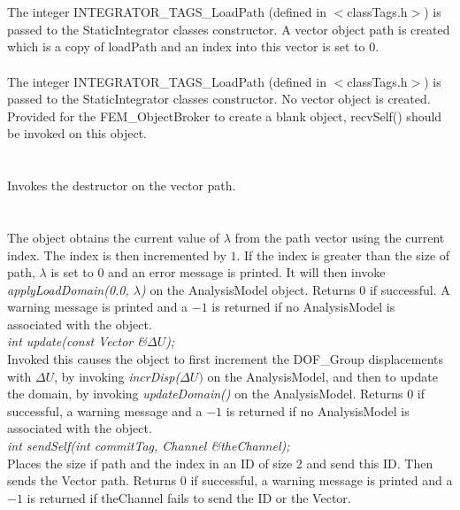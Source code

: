  \\
\\ 
The integer INTEGRATOR\_TAGS\_LoadPath (defined in
$<$classTags.h$>$) is passed to the StaticIntegrator classes
constructor. A vector object \p path is created which is a copy of
\p loadPath and an index into this vector is set to $0$.\\

\\ 
The integer INTEGRATOR\_TAGS\_LoadPath (defined in $<$classTags.h$>$) is
passed to the StaticIntegrator classes constructor. No vector object
is created. Provided for the FEM\_ObjectBroker to create a blank
object, recvSelf() should be invoked on this object. \\

 \\
\\ 
Invokes the destructor on the vector \p path. \\

\\
 \\
The object obtains the current value of $\lambda$ from the \p path
vector using the current index. The index is then incremented by
$1$. If the index is greater than the size of \p path, $\lambda$ is
set to $0$ and an error message is printed. It will then invoke
{\em applyLoadDomain(0.0, $\lambda$)} on the AnalysisModel
object. Returns $0$ if successful. A warning message is printed and a
$-1$ is returned if no AnalysisModel is associated with the object. \\

{\em int update(const Vector \&$\Delta U$);} \\
Invoked this causes the object to first increment the DOF\_Group
displacements with $\Delta U$, by invoking {\em incrDisp($\Delta U)$}
on the AnalysisModel, and then to update the domain, by invoking {\em
updateDomain()} on the AnalysisModel. Returns $0$ if successful, a
warning message and a $-1$ is returned if no AnalysisModel is
associated with the object. \\


{\em int sendSelf(int commitTag, Channel \&theChannel); } \\ 
Places the size if \p path and the index in an ID of size 2 and send this
ID. Then sends the Vector \p path. Returns $0$ if successful, a
warning message is printed and a $-1$ is returned if \p theChannel
fails to send the ID or the Vector. \\ 

